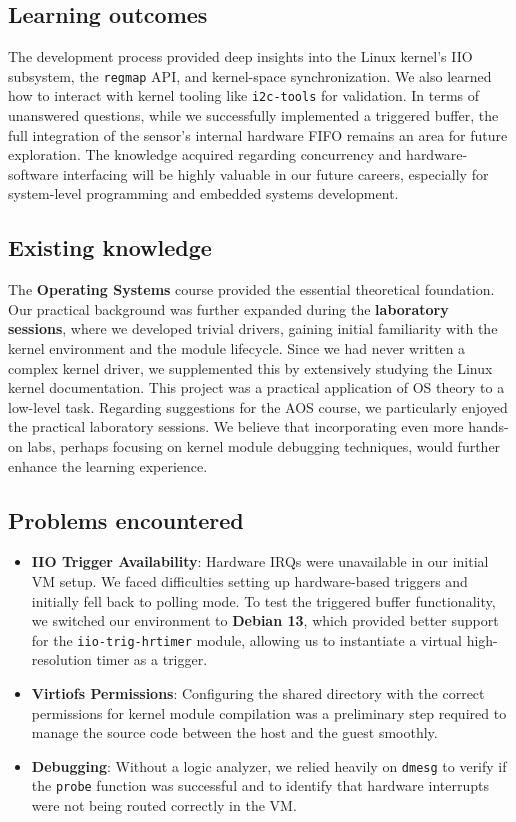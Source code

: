 \documentclass[10pt,a4paper]{article}
\begin{document}
\subsection{Learning outcomes}
The development process provided deep insights into the Linux kernel's IIO subsystem, the \texttt{regmap} API, and kernel-space synchronization. We also learned how to interact with kernel tooling like \texttt{i2c-tools} for validation. 
In terms of unanswered questions, while we successfully implemented a triggered buffer, the full integration of the sensor's internal hardware FIFO remains an area for future exploration. The knowledge acquired regarding concurrency and hardware-software interfacing will be highly valuable in our future careers, especially for system-level programming and embedded systems development.

\subsection{Existing knowledge}
The \textbf{Operating Systems} course provided the essential theoretical foundation. Our practical background was further expanded during the \textbf{laboratory sessions}, where we developed trivial drivers, gaining initial familiarity with the kernel environment and the module lifecycle. Since we had never written a complex kernel driver, we supplemented this by extensively studying the Linux kernel documentation. This project was a practical application of OS theory to a low-level task.
Regarding suggestions for the AOS course, we particularly enjoyed the practical laboratory sessions. We believe that incorporating even more hands-on labs, perhaps focusing on kernel module debugging techniques, would further enhance the learning experience.

\subsection{Problems encountered}
\begin{itemize}
    \item \textbf{IIO Trigger Availability}: Hardware IRQs were unavailable in our initial VM setup. We faced difficulties setting up hardware-based triggers and initially fell back to polling mode. To test the triggered buffer functionality, we switched our environment to \textbf{Debian 13}, which provided better support for the \texttt{iio-trig-hrtimer} module, allowing us to instantiate a virtual high-resolution timer as a trigger.
    \item \textbf{Virtiofs Permissions}: Configuring the shared directory with the correct permissions for kernel module compilation was a preliminary step required to manage the source code between the host and the guest smoothly.
    \item \textbf{Debugging}: Without a logic analyzer, we relied heavily on \texttt{dmesg} to verify if the \texttt{probe} function was successful and to identify that hardware interrupts were not being routed correctly in the VM.
\end{itemize}
\end{document}
